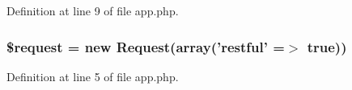 \-Definition at line 9 of file app.\-php.

\hypertarget{app_8php_abb35c8495a232b510389fa6d7b15d38a}{
\subsubsection[{\$request}]{\setlength{\rightskip}{0pt plus 5cm}\$request = new {\bf \-Request}(array('restful' =$>$ true))}}\label{app_8php_abb35c8495a232b510389fa6d7b15d38a}


\-Definition at line 5 of file app.\-php.

